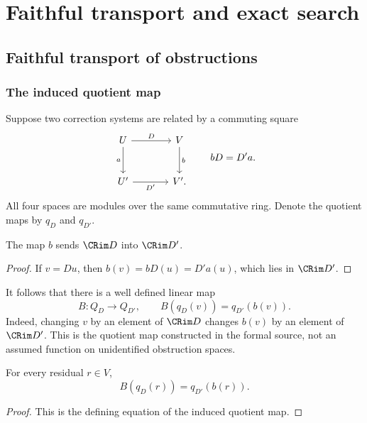 \chapter{Faithful transport and exact search}\label{CR:book:chapter-56}
\section{Faithful transport of obstructions}\label{CR:cr-source-section-4}\label{CR:ch:transport}
\subsection{The induced quotient map}
Suppose two correction systems are related by a commuting square
\begin{equation}\label{CR:eq:square}
\begin{tikzcd}[column sep=large,row sep=large]
U \arrow[r,"D"] \arrow[d,"a"'] & V \arrow[d,"b"]\\
U' \arrow[r,"D'"'] & V'.
\end{tikzcd}
\qquad bD=D'a.
\end{equation}
All four spaces are modules over the same commutative ring. Denote the quotient maps by $q_D$ and $q_{D'}$.

\begin{CRlemma}\label{CR:lem:range-maps}
The map $b$ sends $\CRim D$ into $\CRim D'$.
\end{CRlemma}
\begin{proof}
If $v=Du$, then $b(v)=bD(u)=D'a(u)$, which lies in $\CRim D'$.
\end{proof}

It follows that there is a well defined linear map
\[
B:Q_D\longrightarrow Q_{D'},\qquad B(q_D(v))=q_{D'}(b(v)).
\]
Indeed, changing $v$ by an element of $\CRim D$ changes $b(v)$ by an element of $\CRim D'$. This is the quotient map constructed in the formal source, not an assumed function on unidentified obstruction spaces.

\begin{CRproposition}[Naturality]\label{CR:prop:naturality}
For every residual $r\in V$,
\begin{equation}\label{CR:eq:naturality}
B(q_D(r))=q_{D'}(b(r)).
\end{equation}
\end{CRproposition}
\begin{proof}
This is the defining equation of the induced quotient map.
\end{proof}

